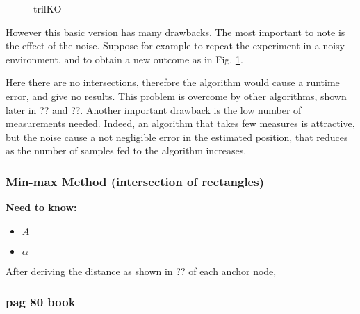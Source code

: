 \documentclass[12pt]{article}
\begin{document}
\begin{figure}
\centering
{}
\caption{trilKO} \label{fig:trilKO}
\end{figure}

However this basic version has many drawbacks. The most important to note is the effect of the noise. Suppose for example to repeat the experiment in a noisy environment, and to obtain a new outcome as in Fig. \ref{fig:trilKO}.

Here there are no intersections, therefore the algorithm would cause a runtime error, and give no results. This problem is overcome by other algorithms, shown later in ?? and ??. Another important drawback is the low number of measurements needed. Indeed, an algorithm that takes few measures is attractive, but the noise cause a not negligible error in the estimated position, that reduces as the number of samples fed to the algorithm increases.

\subsubsection{Min-max Method (intersection of rectangles)}
  \begin{center}
  \textbf{Need to know:}
  \begin{itemize}
    \centering
    \item $A$
    \item $\alpha$
  \end{itemize}
  \end{center}
After deriving the distance as shown in ?? of each anchor node, 
\clearpage
\subsubsection{pag 80 book}
\end{document}
